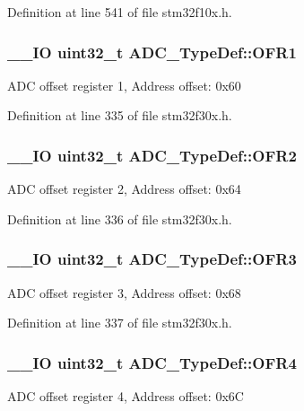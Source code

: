 Definition at line 541 of file stm32f10x.\-h.

\hypertarget{struct_a_d_c___type_def_a97988c41c381690e8a38fec8d2d24ca5}{
\subsubsection[{O\-F\-R1}]{\setlength{\rightskip}{0pt plus 5cm}\-\_\-\-\_\-\-I\-O {\bf uint32\-\_\-t} A\-D\-C\-\_\-\-Type\-Def\-::\-O\-F\-R1}}\label{struct_a_d_c___type_def_a97988c41c381690e8a38fec8d2d24ca5}
A\-D\-C offset register 1, Address offset\-: 0x60 

Definition at line 335 of file stm32f30x.\-h.

\hypertarget{struct_a_d_c___type_def_ae446fdae782b6dd059e348fc877681a6}{
\subsubsection[{O\-F\-R2}]{\setlength{\rightskip}{0pt plus 5cm}\-\_\-\-\_\-\-I\-O {\bf uint32\-\_\-t} A\-D\-C\-\_\-\-Type\-Def\-::\-O\-F\-R2}}\label{struct_a_d_c___type_def_ae446fdae782b6dd059e348fc877681a6}
A\-D\-C offset register 2, Address offset\-: 0x64 

Definition at line 336 of file stm32f30x.\-h.

\hypertarget{struct_a_d_c___type_def_a23083f97baee16e0002366547c8cb5ea}{
\subsubsection[{O\-F\-R3}]{\setlength{\rightskip}{0pt plus 5cm}\-\_\-\-\_\-\-I\-O {\bf uint32\-\_\-t} A\-D\-C\-\_\-\-Type\-Def\-::\-O\-F\-R3}}\label{struct_a_d_c___type_def_a23083f97baee16e0002366547c8cb5ea}
A\-D\-C offset register 3, Address offset\-: 0x68 

Definition at line 337 of file stm32f30x.\-h.

\hypertarget{struct_a_d_c___type_def_a232fcdf46374a9c267c2a6533a777fac}{
\subsubsection[{O\-F\-R4}]{\setlength{\rightskip}{0pt plus 5cm}\-\_\-\-\_\-\-I\-O {\bf uint32\-\_\-t} A\-D\-C\-\_\-\-Type\-Def\-::\-O\-F\-R4}}\label{struct_a_d_c___type_def_a232fcdf46374a9c267c2a6533a777fac}
A\-D\-C offset register 4, Address offset\-: 0x6\-C 


